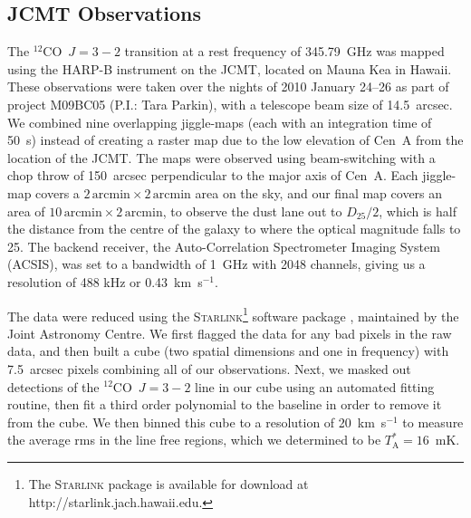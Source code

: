 \documentclass[useAMS,usenatbib,usegraphicx]{mn2e}
\begin{document}
\subsection{JCMT Observations}\label{subsec:JCMT}
 The $^{12}$CO~$J = 3-2$ transition at a rest frequency of 345.79~GHz was mapped using the HARP-B instrument on the JCMT, located on Mauna Kea in Hawaii.  These observations were taken over the nights of 2010 January 24--26 as part of project M09BC05 (P.I.: Tara Parkin), with a telescope beam size of 14.5~arcsec.  We combined nine overlapping jiggle-maps (each with an integration time of 50~s) instead of creating a raster map due to the low elevation of Cen~A from the location of the JCMT.  The maps were observed using beam-switching with a chop throw of 150~arcsec perpendicular to the major axis of Cen~A.  Each jiggle-map covers a $2 \mathrm{\,arcmin} \times 2 \mathrm{\,arcmin}$ area on the sky, and our final map covers an area of $10 \mathrm{\,arcmin} \times 2 \mathrm{\,arcmin}$, to observe the dust lane out to $D_{25}/2$, which is half the distance from the centre of the galaxy to where the optical magnitude falls to 25.  The backend receiver, the Auto-Correlation Spectrometer Imaging System (ACSIS), was set to a bandwidth of 1~GHz with 2048 channels, giving us a resolution of 488 kHz or 0.43~km~s$^{-1}$.

The data were reduced using the \textsc{Starlink}\footnote{The \textsc{Starlink} package is available for download at http://starlink.jach.hawaii.edu.} software package \citep{2008ASPC..394..650C}, maintained by the Joint Astronomy Centre.  We first flagged the data for any bad pixels in the raw data, and then built a cube (two spatial dimensions and one in frequency) with 7.5~arcsec pixels combining all of our observations.  Next, we masked out detections of the $^{12}$CO~$J = 3-2$ line in our cube using an automated fitting routine, then fit a third order polynomial to the baseline in order to remove it from the cube.  We then binned this cube to a resolution of 20~km~s$^{-1}$ to measure the average rms in the line free regions, which we determined to be $T_{\mathrm{A}}^{\ast} = 16$~mK.
\end{document}
